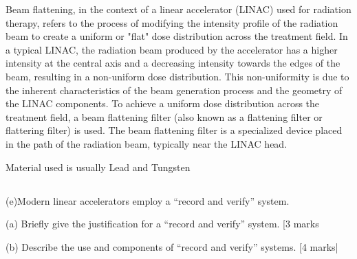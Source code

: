 \documentclass[11pt,letterpaper]{article}
\begin{document}
{{Beam flattening, in the context of a linear accelerator (LINAC) used for radiation therapy, refers to the process of modifying the intensity profile of the radiation beam to create a uniform or "flat" dose distribution across the treatment field.
In a typical LINAC, the radiation beam produced by the accelerator has a higher intensity at the central axis and a decreasing intensity towards the edges of the beam, resulting in a non-uniform dose distribution. This non-uniformity is due to the inherent characteristics of the beam generation process and the geometry of the LINAC components.
To achieve a uniform dose distribution across the treatment field, a beam flattening filter (also known as a flattening filter or flattering filter) is used. The beam flattening filter is a specialized device placed in the path of the radiation beam, typically near the LINAC head.

Material used is usually Lead and Tungsten}
\subsection*{}(e)Modern linear accelerators employ a “record and verify”  system.

(a) Briefly give the justification for a “record and verify”  system. [3 marks}

(b) Describe the use and components of “record and verify” systems. [4 marks|
\end{document}
